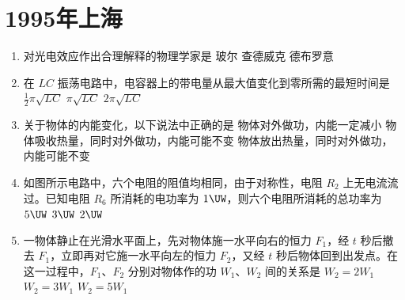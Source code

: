 \documentclass[\gkver]{gaokaozhenti}
\begin{document}
\chapter{1995年上海}

\begin{enumerate}
\item
对光电效应作出合理解释的物理学家是
{玻尔}
{查德威克}
{德布罗意}

\item
在 $LC$ 振荡电路中，电容器上的带电量从最大值变化到零所需的最短时间是
{$\frac{1}{2}\pi\sqrt{LC}$}
{$\pi\sqrt{LC}$}
{$2\pi\sqrt{LC}$}

\item
关于物体的内能变化，以下说法中正确的是
{物体对外做功，内能一定减小}
{物体吸收热量，同时对外做功，内能可能不变}
{物体放出热量，同时对外做功，内能可能不变}

\item
如图所示电路中，六个电阻的阻值均相同，由于对称性，电阻 $R_{2}$ 上无电流流过。已知电阻 $R_{6}$ 所消耗的电功率为 $1\UW$，则六个电阻所消耗的总功率为
\onepicture[h=4.30cm]{}
\fourchoices[answer=D]
{$6\UW$}
{$5\UW$}
{$3\UW$}
{$2\UW$}

\item
一物体静止在光滑水平面上，先对物体施一水平向右的恒力 $F_{1}$，经 $t$ 秒后撤去 $F_{1}$，立即再对它施一水平向左的恒力 $F_{2}$，又经 $t$ 秒后物体回到出发点。在这一过程中，$F_{1}$、$F_{2}$ 分别对物体作的功 $W_{1}$、$W_{2}$ 间的关系是
{$W_{2} = 2W_{1}$}
{$W_{2} = 3W_{1}$}
{$W_{2} = 5W_{1}$}


\end{enumerate}
\end{document}
